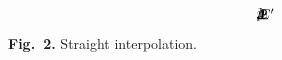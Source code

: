 \unitlength=20mm
$$
\begin{picture}(2,1)(0,0)
\thicklines
  \put(-0.05,0){\line(1,0){2.15}}
  \put(0,-0.05){\line(0,1){1.15}}
  \put(1, -0.5){$E'$}
  \put(-0.45, 0.6){$p$}
  \put (-0.05, 1){\line(1,0){0.05}}
  \put (-0.2, 1){$1$}
  \put (0, 0.95){\line(1,0){1}}
  \put (1, 0.05){\line(1,0){1}}
  \put (1,-0.05){\line(0,1){1}}
  \put (1, -0.2){$1$}
  \put (2,-0.05){\line(0,1){0.1}}
  \put (2, -0.2){$2$}
\end{picture}
$$
\vglue 40pt
\centerline{{\bf Fig.~2.}  Straight interpolation.}
